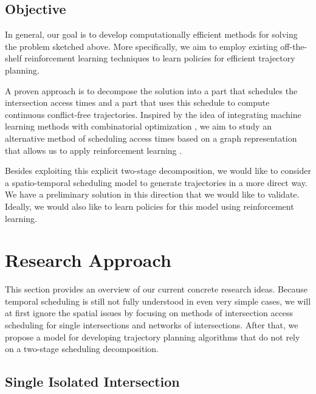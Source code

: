 \documentclass{article}
\begin{document}
\subsection{Objective}

In general, our goal is to develop computationally efficient methods for solving
the problem sketched above. More specifically, we aim to employ existing
off-the-shelf reinforcement learning techniques to learn policies for efficient
trajectory planning.

A proven approach is to decompose the solution into a part that schedules the
intersection access times and a part that uses this schedule to compute
continuous conflict-free trajectories. Inspired by the idea of integrating
machine learning methods with combinatorial optimization
\cite{bengio_machine_2020}, we aim to study an alternative method of scheduling
access times based on a graph representation that allows us to apply
reinforcement learning \cite{zhang_learning_2020}.

Besides exploiting this explicit two-stage decomposition, we would like to
consider a spatio-temporal scheduling model to generate trajectories in a more
direct way. We have a preliminary solution in this direction that we would like
to validate. Ideally, we would also like to learn policies for this model using
reinforcement learning.


\section{Research Approach} \label{sec:approach}

This section provides an overview of our current concrete research ideas.
Because temporal scheduling is still not fully understood in even very simple
cases, we will at first ignore the spatial issues by focusing on methods of
intersection access scheduling for single intersections and networks of
intersections. After that, we propose a model for developing trajectory planning
algorithms that do not rely on a two-stage scheduling decomposition.


\subsection{Single Isolated Intersection}
\label{sec:single}
\end{document}
